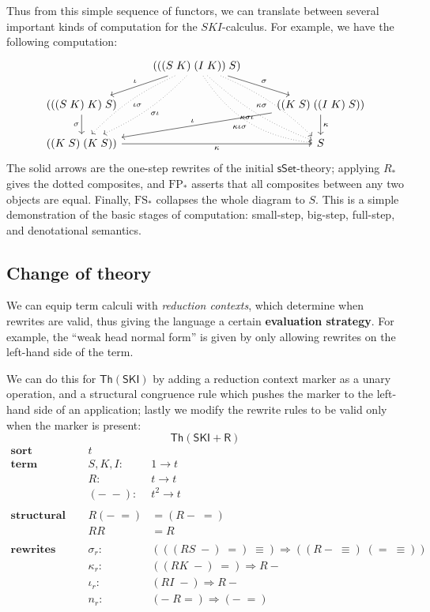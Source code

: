 \documentclass{amsart}
\theoremstyle{definition}
\newcommand{\sSet}{\mathsf{sSet}}
\newcommand{\Th}{\mathsf{Th}}
\newcommand{\FP}{\mathrm{FP}}
\newcommand{\FS}{\mathrm{FS}}
\newcommand{\maps}{\colon}
\begin{document}
Thus from this simple sequence of functors, we can translate between several important kinds of computation for the $SKI$-calculus. For example, we have the following computation:
\[\begin{tikzcd}
&	(((S\; K)\; (I\; K))\; S) \arrow[rd,"\sigma"] \arrow[ld,swap,"\iota"] \arrow[ddl,dotted,bend left=10,"\sigma\iota"] \arrow[ddl,dotted,bend right=10,"\iota\sigma"] \arrow[ddr,dotted,swap,bend left=10,"\kappa\sigma"] \arrow[ddr,dotted,bend right=10,swap,"\kappa\sigma\iota"] \arrow[ddr,dotted,swap,bend right=25,"\kappa\iota\sigma"] &\\
(((S\; K)\; K)\; S) \arrow[d,swap,"\sigma"] & & ((K\; S)\; ((I\; K)\; S)) \arrow[lld,swap,"\iota"] \arrow[d,"\kappa"]\\
((K\; S)\; (K\; S)) \arrow[rr,swap,"\kappa"] & & S
\end{tikzcd}\]
The solid arrows are the one-step rewrites of the initial $\sSet$-theory; applying $R_*$ gives the dotted composites, and $\FP_*$ asserts that all composites between any two objects are equal. Finally, $\FS_*$ collapses the whole diagram to $S$. This is a simple demonstration of the basic stages of computation: small-step, big-step, full-step, and denotational semantics.

\subsection{Change of theory}

We can equip term calculi with \textit{reduction contexts}, which determine when rewrites are valid, thus giving the language a certain \textbf{evaluation strategy}. For example, the ``weak head normal form'' is given by only allowing rewrites on the left-hand side of the term.

We can do this for $\Th(\mathsf{SKI})$ by adding a reduction context marker as a unary operation, and a structural congruence rule which pushes the marker to the left-hand side of an application; lastly we modify the rewrite rules to be valid only when the marker is present:
$$\Th(\mathsf{SKI}+\mathsf{R})$$
\[\begin{array}{lrl}
\textbf{sort} & t &\\
\textbf{term constructors} & S,K,I \maps &1 \to t\\
& R\maps & t \to t\\
& (-\; -)\maps & t^2 \to t\\\\
    \textbf{structural congruence} & R(-\; =) & = (R-\; =) \\
& RR & = R\\\\
    \textbf{rewrites} & \sigma_r\maps & (((RS\; -)\; =)\; \equiv) \Rightarrow ((R-\; \equiv)\; (=\; \equiv))\\
& \kappa_r\maps & ((RK\; -)\; =) \Rightarrow R-\\
              & \iota_r\maps & (RI\; -) \Rightarrow R-\\
    & n_r\maps & (-\; R=) \Rightarrow (-\; =) \\
\end{array}\]
\end{document}
